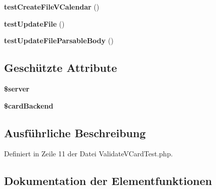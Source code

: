 \begin{DoxyCompactItemize}
{\bfseries test\+Create\+File\+V\+Calendar} ()
\item 
\mbox{\label{class_sabre_1_1_card_d_a_v_1_1_validate_v_card_test_aff65efecab60e3b72a9c1c5ed22cc391}} 
{\bfseries test\+Update\+File} ()
\item 
\mbox{\label{class_sabre_1_1_card_d_a_v_1_1_validate_v_card_test_ab1f368e581937bd404cb5d381fe118ee}} 
{\bfseries test\+Update\+File\+Parsable\+Body} ()
\end{DoxyCompactItemize}
\subsection*{Geschützte Attribute}
\begin{DoxyCompactItemize}
\item 
\mbox{\label{class_sabre_1_1_card_d_a_v_1_1_validate_v_card_test_ad6ae395e514f8f50492d2ba6634506b2}} 
{\bfseries \$server}
\item 
\mbox{\label{class_sabre_1_1_card_d_a_v_1_1_validate_v_card_test_ae2071687004313f0b3995ed5538b2124}} 
{\bfseries \$card\+Backend}
\end{DoxyCompactItemize}


\subsection{Ausführliche Beschreibung}


Definiert in Zeile 11 der Datei Validate\+V\+Card\+Test.\+php.



\subsection{Dokumentation der Elementfunktionen}
\mbox{\label{class_sabre_1_1_card_d_a_v_1_1_validate_v_card_test_a8b8af0bd4c4f077e3179de579af6c0a3}} 
